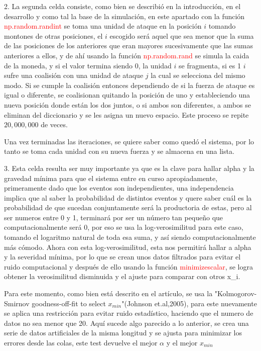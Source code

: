 \documentclass[twoside, a4paper, 12pt, spanish]{article}
\begin{document}
2. La segunda celda consiste, como bien se describió en la introducción, en el desarrollo y como tal la base de la simulación, en este apartado con la función \textcolor{red}{np.random.randint} \text se toma una unidad de ataque en la posición $i$ tomando montones de otras posiciones, el $i$ escogido será aquel que sea menor que la suma de las posiciones de los anteriores que eran mayores sucesivamente que las sumas anteriores a ellos, y de ahí usando la función \textcolor{red}{np.random.rand} \text se simula la caida de la moneda, y si el valor termina siendo 0, la unidad $i$ se fragmenta, si es 1 $i$ sufre una coalisión con una unidad de ataque $j$ la cual se selecciona del mismo modo.
Si se cumple la coalisión entonces dependiendo de si la fuerza de ataque es igual o diferente, se coalisionan quitando la posición de uno y estableciendo una nueva posición donde están los dos juntos, o si ambos son diferentes, a ambos se eliminan del diccionario y se les asigna un nuevo espacio. Este proceso se repite $20,000,000$ de veces.

Una vez terminadas las iteraciones, se quiere saber como quedó el sistema, por lo tanto se toma cada unidad con su nueva fuerza y se almacena en una lista.

3. Esta celda resulta ser muy importante ya que es la clave para hallar alpha y la gravedad mínima para que el sistema entre en curso apropiadamente, primeramente dado que los eventos son independientes, una independencia implica que al saber la probabilidad de distintos eventos y quere saber cuál es la probabilidad de que sucedan conjuntamente será la productoria de estas, pero al ser numeros entre 0 y 1, terminará por ser un número tan pequeño que computacionalmente será 0, por eso se usa la log-verosimilitud para este caso, tomando el logaritmo natural de toda esa suma, y así siendo computacionalmente más cómodo.
Ahora con esta log-verosimilitud, esta nos permitirá hallar a alpha y la severidad mínima, por lo que se crean unos datos filtrados para evitar el ruido computacional y después de ello usando la función \textcolor{red}{minimizescalar}, se logra obtener la verosimilitud disminuida y el ajuste para comparar con otros x_i.

Para este momento, como bien está descrito en el artículo, se usa la "Kolmogorov-Smirnov goodness-off-fit to select $x_{min}$"(Johnson et.al,2005), para este nuevamente se aplica una restricción para evitar ruido estadístico, haciendo que el numero de datos no sea menor que 20. 
Aquí sucede algo parecido a lo anterior, se crea una serie de datos artificiales de la misma longitud y se ajusta para minimizar los errores desde las colas, este test devuelve el mejor $\alpha$ y el mejor $x_{min}$
\end{document}
